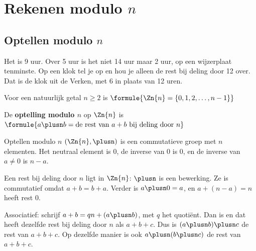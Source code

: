 \section{Rekenen modulo \texorpdfstring{$n$}{n}}

\subsection{Optellen modulo \texorpdfstring{$n$}{n}}

Het is 9 uur. Over 5 uur is het niet 14 uur maar 2 uur, op een wijzerplaat tenminste. Op een klok tel je op en hou je alleen de rest bij deling door 12 over. Dat is de klok uit de Verken, met 6 in plaats van 12 uren.

\begin{theorie}
Voor een natuurlijk getal $n \geqslant 2$ is \quad $\formule{\Zn{n} = \{0, 1, 2, \ldots, n - 1\}}$

\vspace{1mm}
De \textbf{\textcolor{accent}{optelling modulo $n$}} op $\Zn{n}$ is \quad $\formule{a \plusn b = \text{de rest van } a + b \text{ bij deling door } n}$

\begin{stelling}{Optellen modulo $n$}
$(\Zn{n}, \plusn)$ is een commutatieve groep met $n$ elementen. Het neutraal element is 0, de inverse van 0 is 0, en de inverse van $a \neq 0$ is $n - a$.
\end{stelling}

\begin{bewijs}
Een rest bij deling door $n$ ligt in $\Zn{n}$: $\plusn$ is een bewerking. Ze is commutatief omdat $a + b = b + a$. Verder is $a \plusn 0 = a$, en $a + (n - a) = n$ heeft rest 0.

Associatief: schrijf $a + b = qn + (a \plusn b)$, met $q$ het quotiënt. Dan is
en dat heeft dezelfde rest bij deling door $n$ als $a + b + c$. Dus is $(a \plusn b) \plusn c$ de rest van $a + b + c$. Op dezelfde manier is ook $a \plusn (b \plusn c)$ de rest van $a + b + c$.
\end{bewijs}
\end{theorie}


